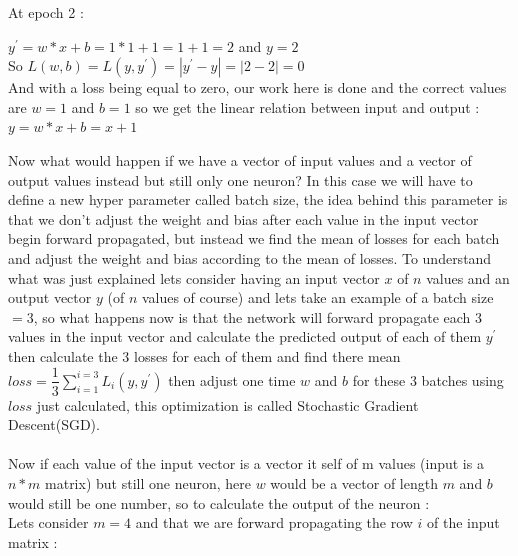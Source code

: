 \documentclass[10pt,a4paper]{article}
\begin{document}
At epoch 2 :
\begin{center}
$ y^{\prime} = w*x + b = 1*1 + 1 = 1 + 1 = 2 $ \hspace{5mm} and \hspace{5mm} $ y = 2 $\\
So \hspace{5mm} $ L(w,b) = L(y,y^{\prime}) = |y^{\prime} - y| = |2 - 2| = 0 $\\
And with a loss being equal to zero, our work here is done and the correct values are $ w = 1 $ and $ b = 1 $ so we get the linear relation between input and output : $ y = w*x + b = x + 1 $
\end{center}
Now what would happen if we have a vector of input values and a vector of output values instead but still only one neuron? In this case we will have to define a new hyper parameter called batch size, the idea behind this parameter is that we don't adjust the weight and bias after each value in the input vector begin forward propagated, but instead we find the mean of losses for each batch and adjust the weight and bias according to the mean of losses. To understand what was just explained lets consider having an input vector $ x $ of $ n $ values and an output vector $ y $ (of $ n $ values of course) and lets take an example of a batch size $ = 3 $, so what happens now is that the network will forward propagate each 3 values in the input vector and calculate the predicted output of each of them $ y^{\prime} $ then calculate the 3 losses for each of them and find there mean $ loss = \dfrac{1}{3}\sum_{i=1}^{i=3}L_i(y,y^{\prime}) $ then adjust one time $ w $ and $ b $ for these 3 batches using $ loss $ just calculated, this optimization is called Stochastic Gradient Descent(SGD).\\\\
Now if each value of the input vector is a vector it self of m values (input is a $ n*m $ matrix) but still one neuron, here $ w $ would be a vector of length $ m $ and $ b $ would still be one number, so to calculate the output of the neuron :\\
Lets consider $ m = 4 $ and that we are forward propagating the row $ i $ of the input matrix :\\
\end{document}
